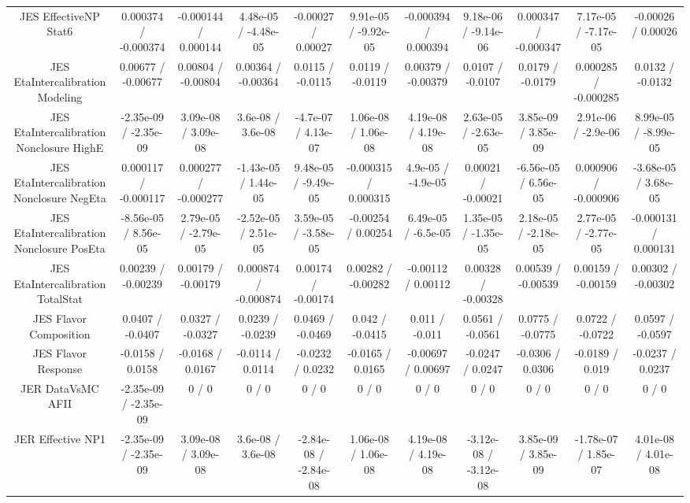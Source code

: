 \begin{table}[htbp]
\begin{center}
\begin{tabular}{|c|c|c|c|c|c|c|c|c|c|c|}
  JES EffectiveNP Stat6 & 0.000374 / -0.000374 & -0.000144 / 0.000144 & 4.48e-05 / -4.48e-05 & -0.00027 / 0.00027 & 9.91e-05 / -9.92e-05 & -0.000394 / 0.000394 & 9.18e-06 / -9.14e-06 & 0.000347 / -0.000347 & 7.17e-05 / -7.17e-05 & -0.00026 / 0.00026 \\ 
  JES EtaIntercalibration Modeling & 0.00677 / -0.00677 & 0.00804 / -0.00804 & 0.00364 / -0.00364 & 0.0115 / -0.0115 & 0.0119 / -0.0119 & 0.00379 / -0.00379 & 0.0107 / -0.0107 & 0.0179 / -0.0179 & 0.000285 / -0.000285 & 0.0132 / -0.0132 \\ 
  JES EtaIntercalibration Nonclosure HighE & -2.35e-09 / -2.35e-09 & 3.09e-08 / 3.09e-08 & 3.6e-08 / 3.6e-08 & -4.7e-07 / 4.13e-07 & 1.06e-08 / 1.06e-08 & 4.19e-08 / 4.19e-08 & 2.63e-05 / -2.63e-05 & 3.85e-09 / 3.85e-09 & 2.91e-06 / -2.9e-06 & 8.99e-05 / -8.99e-05 \\ 
  JES EtaIntercalibration Nonclosure NegEta & 0.000117 / -0.000117 & 0.000277 / -0.000277 & -1.43e-05 / 1.44e-05 & 9.48e-05 / -9.49e-05 & -0.000315 / 0.000315 & 4.9e-05 / -4.9e-05 & 0.00021 / -0.00021 & -6.56e-05 / 6.56e-05 & 0.000906 / -0.000906 & -3.68e-05 / 3.68e-05 \\ 
  JES EtaIntercalibration Nonclosure PosEta & -8.56e-05 / 8.56e-05 & 2.79e-05 / -2.79e-05 & -2.52e-05 / 2.51e-05 & 3.59e-05 / -3.58e-05 & -0.00254 / 0.00254 & 6.49e-05 / -6.5e-05 & 1.35e-05 / -1.35e-05 & 2.18e-05 / -2.18e-05 & 2.77e-05 / -2.77e-05 & -0.000131 / 0.000131 \\ 
  JES EtaIntercalibration TotalStat & 0.00239 / -0.00239 & 0.00179 / -0.00179 & 0.000874 / -0.000874 & 0.00174 / -0.00174 & 0.00282 / -0.00282 & -0.00112 / 0.00112 & 0.00328 / -0.00328 & 0.00539 / -0.00539 & 0.00159 / -0.00159 & 0.00302 / -0.00302 \\ 
  JES Flavor Composition & 0.0407 / -0.0407 & 0.0327 / -0.0327 & 0.0239 / -0.0239 & 0.0469 / -0.0469 & 0.042 / -0.0415 & 0.011 / -0.011 & 0.0561 / -0.0561 & 0.0775 / -0.0775 & 0.0722 / -0.0722 & 0.0597 / -0.0597 \\ 
  JES Flavor Response & -0.0158 / 0.0158 & -0.0168 / 0.0167 & -0.0114 / 0.0114 & -0.0232 / 0.0232 & -0.0165 / 0.0165 & -0.00697 / 0.00697 & -0.0247 / 0.0247 & -0.0306 / 0.0306 & -0.0189 / 0.019 & -0.0237 / 0.0237 \\ 
  JER DataVsMC AFII & -2.35e-09 / -2.35e-09 & 0 / 0 & 0 / 0 & 0 / 0 & 0 / 0 & 0 / 0 & 0 / 0 & 0 / 0 & 0 / 0 & 0 / 0 \\ 
  JER Effective NP1 & -2.35e-09 / -2.35e-09 & 3.09e-08 / 3.09e-08 & 3.6e-08 / 3.6e-08 & -2.84e-08 / -2.84e-08 & 1.06e-08 / 1.06e-08 & 4.19e-08 / 4.19e-08 & -3.12e-08 / -3.12e-08 & 3.85e-09 / 3.85e-09 & -1.78e-07 / 1.85e-07 & 4.01e-08 / 4.01e-08 \\ 

\end{tabular}
\end{center}
\end{table}
